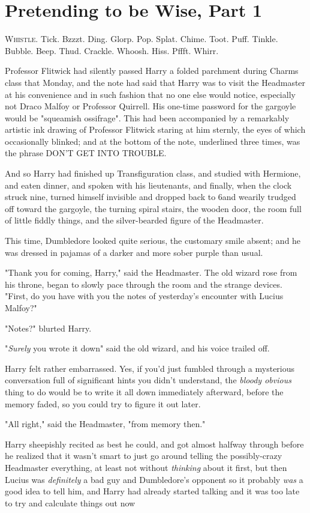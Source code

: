 \chapter{Pretending to be Wise, Part 1}

\lettrine{W}{histle.} Tick.
Bzzzt. Ding. Glorp. Pop. Splat. Chime. Toot. Puff. Tinkle. Bubble. Beep. Thud.
Crackle. Whoosh. Hiss. Pffft. Whirr.

Professor Flitwick had silently passed Harry a folded parchment during Charms
class that Monday, and the note had said that Harry was to visit the Headmaster
at his convenience and in such fashion that no one else would notice,
especially not Draco Malfoy or Professor Quirrell. His one-time password for
the gargoyle would be "squeamish ossifrage". This had been accompanied by a
remarkably artistic ink drawing of Professor Flitwick staring at him sternly,
the eyes of which occasionally blinked; and at the bottom of the note,
underlined three times, was the phrase DON'T GET INTO TROUBLE.

And so Harry had finished up Transfiguration class, and studied with Hermione,
and eaten dinner, and spoken with his lieutenants, and finally, when the clock
struck nine, turned himself invisible and dropped back to 6\PM and wearily
trudged off toward the gargoyle, the turning spiral stairs, the wooden door,
the room full of little fiddly things, and the silver-bearded figure of the
Headmaster.

This time, Dumbledore looked quite serious, the customary smile absent; and he
was dressed in pajamas of a darker and more sober purple than usual.

"Thank you for coming, Harry," said the Headmaster. The old wizard rose from
his throne, began to slowly pace through the room and the strange devices.
"First, do you have with you the notes of yesterday's encounter with Lucius
Malfoy?"

"Notes?" blurted Harry.

"\emph{Surely} you wrote it down{\el}" said the old wizard, and his voice
trailed off.

Harry felt rather embarrassed. Yes, if you'd just fumbled through a mysterious
conversation full of significant hints you didn't understand, the \emph{bloody
obvious} thing to do would be to write it all down immediately afterward,
before the memory faded, so you could try to figure it out later.

"All right," said the Headmaster, "from memory then."

Harry sheepishly recited as best he could, and got almost halfway through
before he realized that it wasn't smart to just go around telling the
possibly-crazy Headmaster everything, at least not without \emph{thinking}
about it first, but then Lucius was \emph{definitely} a bad guy and
Dumbledore's opponent so it probably \emph{was} a good idea to tell him, and
Harry had already started talking and it was too late to try and calculate
things out now{\el}

